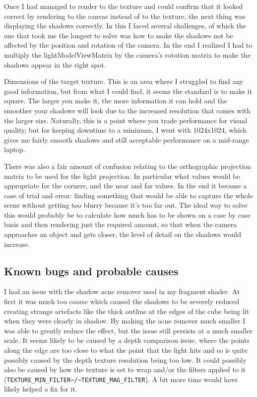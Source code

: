 \documentclass[11pt]{article}
\begin{document}
Once I had managed to render to the texture and could confirm that it looked correct by rendering to the canvas instead of to the texture, the next thing was displaying the shadows correctly. In this I faced several challenges, of which the one that took me the longest to solve was how to make the shadows not be affected by the position and rotation of the camera. In the end I realized I had to multiply the lightModelViewMatrix by the camera's rotation matrix to make the shadows appear in the right spot.

Dimensions of the target texture. This is an area where I struggled to find any good information, but from what I could find, it seems the standard is to make it square. The larger you make it, the more information it can hold and the smoother your shadows will look due to the increased resolution that comes with the larger size. Naturally, this is a point where you trade performance for visual quality, but for keeping downtime to a minimum, I went with 1024x1024, which gives me fairly smooth shadows and still acceptable performance on a mid-range laptop.

There was also a fair amount of confusion relating to the orthographic projection matrix to be used for the light projection. In particular what values would be appropriate for the corners, and the near and far values. In the end it became a case of trial and error: finding something that would be able to capture the whole scene without getting too blurry because it's too far out. The ideal way to solve this would probably be to calculate how much has to be shown on a case by case basis and then rendering just the required amount, so that when the camera approaches an object and gets closer, the level of detail on the shadows would increase.


\subsection{Known bugs and probable causes}
\label{sec:org905fc24}
I had an issue with the shadow acne remover used in my fragment shader. At first it was much too coarse which caused the shadows to be severely reduced creating strange artefacts like the thick outline at the edges of the cube being lit when they were clearly in shadow. By making the acne remover much smaller I was able to greatly reduce the effect, but the issue still persists at a much smaller scale. It seems likely to be caused by a depth comparison issue, where the points along the edge are too close to what the point that the light hits and so is quite possibly caused by the depth texture resolution being too low. It could possibly also be caused by how the texture is set to wrap and/or the filters applied to it (\texttt{TEXTURE\_MIN\_FILTER\textasciitilde{}/\textasciitilde{}TEXTURE\_MAG\_FILTER}). A bit more time would have likely helped a fix for it.
\end{document}
